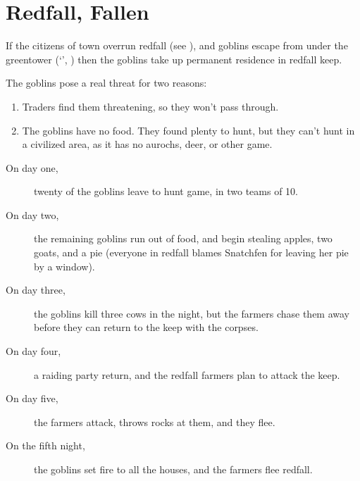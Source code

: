 \section{Redfall, Fallen}
\label{redfallFallen}

%

\begin{multicols}{2}

\noindent
If the citizens of \gls{town} overrun \gls{redfall} (see ), and goblins escape from under the \gls{greentower} (`', ) then the goblins take up permanent residence in \gls{redfall} keep.

The goblins pose a real threat for two reasons:

\begin{enumerate}
  \item
  Traders find them threatening, so they won't pass through.
  \item
  The goblins have no food.
  They found plenty to hunt, but they can't hunt in a civilized area, as it has no aurochs, deer, or other game.
\end{enumerate}

\begin{description}
  \item[On day one,]
  twenty of the goblins leave to hunt game, in two teams of 10.

  \item[On day two,]
  the remaining goblins run out of food, and begin stealing apples, two goats, and a pie (everyone in \gls{redfall} blames Snatchfen for leaving her pie by a window).

  \item[On day three,]
  the goblins kill three cows in the night, but the farmers chase them away before they can return to the keep with the corpses.

  \item[On day four,]
  a raiding party return, and the \gls{redfall} farmers plan to attack the keep.

  \item[On day five,]
  the farmers attack,  throws rocks at them, and they flee.

  \item[On the fifth night,]
  the goblins set fire to all the houses, and the farmers flee \gls{redfall}.
\end{description}


\end{multicols}
